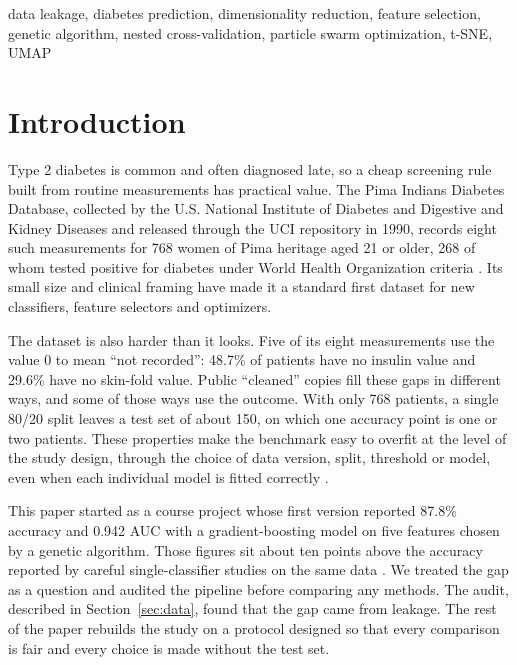 \documentclass[conference]{IEEEtran}
\begin{document}
\begin{IEEEkeywords}
data leakage, diabetes prediction, dimensionality reduction, feature selection, genetic algorithm, nested cross-validation, particle swarm optimization, t-SNE, UMAP
\end{IEEEkeywords}

\section{Introduction}

Type 2 diabetes is common and often diagnosed late, so a cheap screening rule built from routine measurements has practical value. The Pima Indians Diabetes Database, collected by the U.S. National Institute of Diabetes and Digestive and Kidney Diseases and released through the UCI repository in 1990, records eight such measurements for 768 women of Pima heritage aged 21 or older, 268 of whom tested positive for diabetes under World Health Organization criteria \cite{smith1988,uci_pima}. Its small size and clinical framing have made it a standard first dataset for new classifiers, feature selectors and optimizers.

The dataset is also harder than it looks. Five of its eight measurements use the value 0 to mean ``not recorded'': 48.7\% of patients have no insulin value and 29.6\% have no skin-fold value. Public ``cleaned'' copies fill these gaps in different ways, and some of those ways use the outcome. With only 768 patients, a single 80/20 split leaves a test set of about 150, on which one accuracy point is one or two patients. These properties make the benchmark easy to overfit at the level of the study design, through the choice of data version, split, threshold or model, even when each individual model is fitted correctly \cite{kapoor2023,cawley2010}.

This paper started as a course project whose first version reported 87.8\% accuracy and 0.942 AUC with a gradient-boosting model on five features chosen by a genetic algorithm. Those figures sit about ten points above the accuracy reported by careful single-classifier studies on the same data \cite{zou2018,chang2022}. We treated the gap as a question and audited the pipeline before comparing any methods. The audit, described in Section~\ref{sec:data}, found that the gap came from leakage. The rest of the paper rebuilds the study on a protocol designed so that every comparison is fair and every choice is made without the test set.
\end{document}
